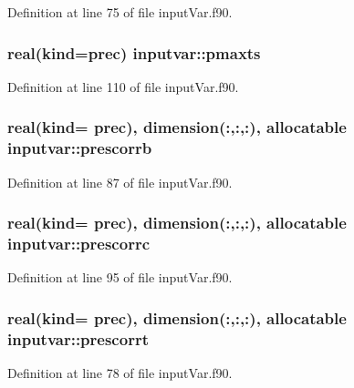 Definition at line 75 of file input\-Var.\-f90.

\hypertarget{classinputvar_a6301e249eea800b1c3052280fce007b2}{
\subsubsection[{pmaxts}]{\setlength{\rightskip}{0pt plus 5cm}real(kind=prec) inputvar\-::pmaxts}}\label{classinputvar_a6301e249eea800b1c3052280fce007b2}


Definition at line 110 of file input\-Var.\-f90.

\hypertarget{classinputvar_a4de979203fa5e65fe0cbfd77c60654ae}{
\subsubsection[{prescorrb}]{\setlength{\rightskip}{0pt plus 5cm}real(kind= prec), dimension(\-:,\-:,\-:), allocatable inputvar\-::prescorrb}}\label{classinputvar_a4de979203fa5e65fe0cbfd77c60654ae}


Definition at line 87 of file input\-Var.\-f90.

\hypertarget{classinputvar_a4ad15e4562f67332a82dd70d6cfcb2fc}{
\subsubsection[{prescorrc}]{\setlength{\rightskip}{0pt plus 5cm}real(kind= prec), dimension(\-:,\-:,\-:), allocatable inputvar\-::prescorrc}}\label{classinputvar_a4ad15e4562f67332a82dd70d6cfcb2fc}


Definition at line 95 of file input\-Var.\-f90.

\hypertarget{classinputvar_a4dc6d715b00d35dbff920be5c37c1d89}{
\subsubsection[{prescorrt}]{\setlength{\rightskip}{0pt plus 5cm}real(kind= prec), dimension(\-:,\-:,\-:), allocatable inputvar\-::prescorrt}}\label{classinputvar_a4dc6d715b00d35dbff920be5c37c1d89}


Definition at line 78 of file input\-Var.\-f90.

